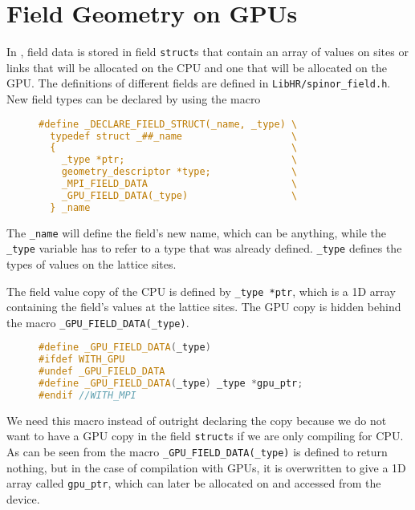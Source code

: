 \documentclass[12pt]{article}
\begin{document}
\section*{Field Geometry on GPUs}
In , field data is stored in field \texttt{struct}s that contain an array of values on sites or links that will be allocated on the CPU and one that will be allocated on the GPU. The definitions of different fields are defined in \texttt{LibHR/spinor\_field.h}. New field types can be declared by using the macro 

\begin{figure}[H]
\begin{lstlisting}[caption=from spinor\_field.h,language=C]
#define _DECLARE_FIELD_STRUCT(_name, _type) \
  typedef struct _##_name                   \
  {                                         \
    _type *ptr;                             \
    geometry_descriptor *type;              \
    _MPI_FIELD_DATA                         \
    _GPU_FIELD_DATA(_type)                  \
  } _name
\end{lstlisting}
\end{figure}

The \texttt{\_name} will define the field's new name, which can be anything, while the \texttt{\_type} variable has to refer to a type that was already defined. \texttt{\_type} defines the types of values on the lattice sites.\par
The field value copy of the CPU is defined by \texttt{\_type *ptr}, which is a 1D array containing the field's values at the lattice sites. The GPU copy is hidden behind the macro \texttt{\_GPU\_FIELD\_DATA(\_type)}. 

\begin{figure}[H]
\begin{lstlisting}[caption=from spinor\_field.h,language=C++]
#define _GPU_FIELD_DATA(_type)
#ifdef WITH_GPU
#undef _GPU_FIELD_DATA
#define _GPU_FIELD_DATA(_type) _type *gpu_ptr;
#endif //WITH_MPI
\end{lstlisting}
\end{figure}

We need this macro instead of outright declaring the copy because we do not want to have a GPU copy in the field \texttt{struct}s if we are only compiling for CPU. As can be seen from the macro \texttt{\_GPU\_FIELD\_DATA(\_type)} is defined to return nothing, but in the case of compilation with GPUs, it is overwritten to give a 1D array called \texttt{gpu\_ptr}, which can later be allocated on and accessed from the device.\par
\end{document}
